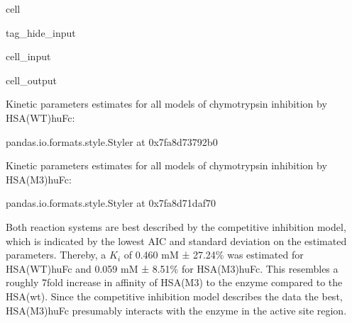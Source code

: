 \documentclass[letterpaper,12pt,english]{jupyterBook}
\begin{document}
\begin{sphinxuseclass}{cell}
\begin{sphinxuseclass}{tag_hide_input}
\begin{sphinxVerbatimInput}
\begin{sphinxuseclass}{cell_input}
\end{sphinxuseclass}\end{sphinxVerbatimInput}
\begin{sphinxVerbatimOutput}

\begin{sphinxuseclass}{cell_output}
\begin{sphinxVerbatim}[commandchars=\\\{\}]
Kinetic parameters estimates for all models of chymotrypsin inhibition by HSA(WT)\PYGZhy{}huFc:
\end{sphinxVerbatim}

\begin{sphinxVerbatim}[commandchars=\\\{\}]
\PYGZlt{}pandas.io.formats.style.Styler at 0x7fa8d73792b0\PYGZgt{}
\end{sphinxVerbatim}

\begin{sphinxVerbatim}[commandchars=\\\{\}]
Kinetic parameters estimates for all models of chymotrypsin inhibition by HSA(M3)\PYGZhy{}huFc:
\end{sphinxVerbatim}

\begin{sphinxVerbatim}[commandchars=\\\{\}]
\PYGZlt{}pandas.io.formats.style.Styler at 0x7fa8d71daf70\PYGZgt{}
\end{sphinxVerbatim}

\noindent{}

\end{sphinxuseclass}\end{sphinxVerbatimOutput}

\end{sphinxuseclass}
\end{sphinxuseclass}
\sphinxAtStartPar
{}

\sphinxAtStartPar
Both reaction systems are best described by the competitive inhibition model, which is indicated by the lowest AIC and standard deviation on the estimated parameters. Thereby, a \(K_{i}\) of 0.460 mM ± 27.24\% was estimated for HSA(WT)\sphinxhyphen{}huFc and 0.059 mM ± 8.51\% for HSA(M3)\sphinxhyphen{}huFc. This resembles a roughly 7\sphinxhyphen{}fold increase in affinity of HSA(M3) to the enzyme compared to the HSA(wt).
Since the competitive inhibition model describes the data the best, HSA(M3)\sphinxhyphen{}huFc presumably interacts with the enzyme in the active site region.
\end{document}
